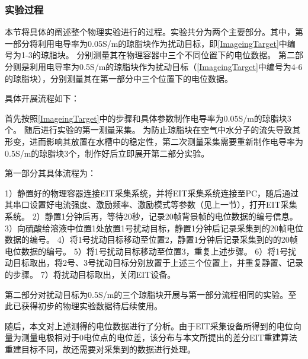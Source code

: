 \subsubsection{实验过程}

本节将具体的阐述整个物理实验进行的过程。实验共分为两个主要部分。其中，第一部分将利用电导率为0.05S/m的琼脂块作为扰动目标，即\cref{ImageingTarget}中编号为1-3的琼脂块。
分别测量其在物理容器中三个不同位置下的电位数据。
第二部分则是利用电导率为0.5S/m的琼脂块作为扰动目标（\cref{ImageingTarget}中编号为4-6的琼脂块），分别测量其在第一部分中三个位置下的电位数据。

具体开展流程如下：

首先按照\cref{ImageingTarget}中的步骤和具体参数制作电导率为0.05S/m的琼脂块3个。
随后进行实验的第一测量采集。
为防止琼脂块在空气中水分子的流失导致其形变，进而影响其放置在水槽中的稳定性，第二次测量采集需要重新制作电导率为0.5S/m的琼脂块3个，制作好后立即展开第二部分实验。

第一部分其具体流程为：

     1）静置好的物理容器连接EIT采集系统，并将EIT采集系统连接至PC，随后通过其串口设置好电流强度、激励频率、激励模式等参数（见上一节），打开EIT采集系统。
     2）静置1分钟后再，等待20秒，记录20帧背景帧的电位数据的编号信息。
     3）向硫酸给溶液中位置1处放置1号扰动目标，静置1分钟后记录采集到的20帧电位数据的编号。
     4）将1号扰动目标移动至位置2，静置1分钟后记录采集到的的20帧电位数据的编号。
     5）将1号扰动目标移动至位置3，重复上述步骤。
     6）将1号扰动目标取出，将2号、3号扰动目标分别放置于上述三个位置上，并重复静置、记录的步骤。
     7）将扰动目标取出，关闭EIT设备。


第二部分对扰动目标为0.5S/m的三个琼脂块开展与第一部分流程相同的实验。至此已获得初步的物理实验数据待后续使用。

随后，本文对上述测得的电位数据进行了分析。由于EIT采集设备所得到的电位向量为测量电极相对于0电位点的电位差，该分布与本文所提出的差分EIT重建算法重建目标不同，故还需要对采集到的数据进行处理。

